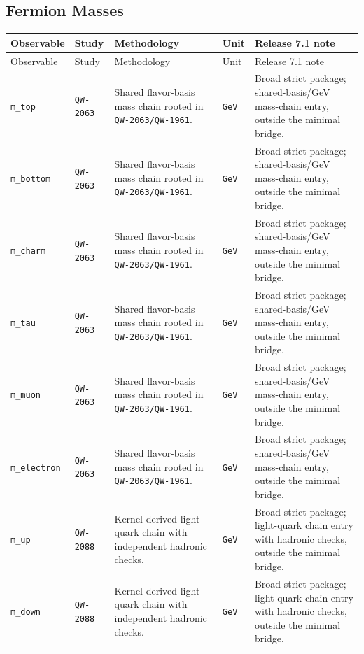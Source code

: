 \subsection{Fermion Masses}

\small
\begin{longtable}{@{}p{2.6cm}p{1.4cm}p{4.8cm}p{1.7cm}p{4.5cm}@{}}
\toprule
Observable & Study & Methodology & Unit & Release 7.1 note \\
\midrule
\endfirsthead
\toprule
Observable & Study & Methodology & Unit & Release 7.1 note \\
\midrule
\endhead
\texttt{m\_top} & \texttt{QW-2063} & Shared flavor-basis mass chain rooted in \texttt{QW-2063/QW-1961}. & \texttt{GeV} & Broad strict package; shared-basis/GeV mass-chain entry, outside the minimal bridge. \\
\texttt{m\_bottom} & \texttt{QW-2063} & Shared flavor-basis mass chain rooted in \texttt{QW-2063/QW-1961}. & \texttt{GeV} & Broad strict package; shared-basis/GeV mass-chain entry, outside the minimal bridge. \\
\texttt{m\_charm} & \texttt{QW-2063} & Shared flavor-basis mass chain rooted in \texttt{QW-2063/QW-1961}. & \texttt{GeV} & Broad strict package; shared-basis/GeV mass-chain entry, outside the minimal bridge. \\
\texttt{m\_tau} & \texttt{QW-2063} & Shared flavor-basis mass chain rooted in \texttt{QW-2063/QW-1961}. & \texttt{GeV} & Broad strict package; shared-basis/GeV mass-chain entry, outside the minimal bridge. \\
\texttt{m\_muon} & \texttt{QW-2063} & Shared flavor-basis mass chain rooted in \texttt{QW-2063/QW-1961}. & \texttt{GeV} & Broad strict package; shared-basis/GeV mass-chain entry, outside the minimal bridge. \\
\texttt{m\_electron} & \texttt{QW-2063} & Shared flavor-basis mass chain rooted in \texttt{QW-2063/QW-1961}. & \texttt{GeV} & Broad strict package; shared-basis/GeV mass-chain entry, outside the minimal bridge. \\
\texttt{m\_up} & \texttt{QW-2088} & Kernel-derived light-quark chain with independent hadronic checks. & \texttt{GeV} & Broad strict package; light-quark chain entry with hadronic checks, outside the minimal bridge. \\
\texttt{m\_down} & \texttt{QW-2088} & Kernel-derived light-quark chain with independent hadronic checks. & \texttt{GeV} & Broad strict package; light-quark chain entry with hadronic checks, outside the minimal bridge. \\

\end{longtable}
